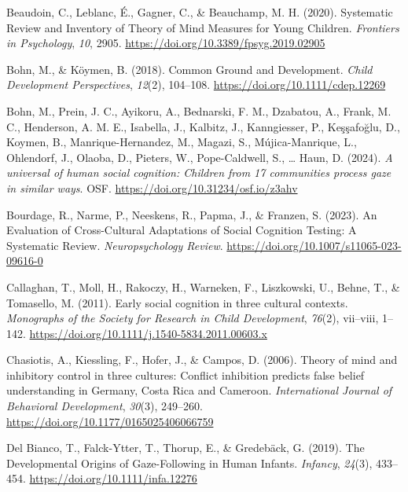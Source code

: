 \documentclass[
  man,mask,floatsintext]{apa7}
\newlength{\cslhangindent}
\newlength{\cslentryspacingunit} %
\newenvironment{CSLReferences}[2] %
 {%
  \setlength{\parindent}{0pt}
  \ifodd #1
  \let\oldpar\par
  \def\par{\hangindent=\cslhangindent\oldpar}
  \fi
  \setlength{\parskip}{#2\cslentryspacingunit}
 }%
 {}
\begin{document}
\hypertarget{refs}{}
\begin{CSLReferences}{1}{0}
\leavevmode{}%
Beaudoin, C., Leblanc, É., Gagner, C., \& Beauchamp, M. H. (2020). Systematic {Review} and {Inventory} of {Theory} of {Mind Measures} for {Young Children}. \emph{Frontiers in Psychology}, \emph{10}, 2905. \url{https://doi.org/10.3389/fpsyg.2019.02905}

\leavevmode{}%
Bohn, M., \& Köymen, B. (2018). Common {Ground} and {Development}. \emph{Child Development Perspectives}, \emph{12}(2), 104--108. \url{https://doi.org/10.1111/cdep.12269}

\leavevmode{}%
Bohn, M., Prein, J. C., Ayikoru, A., Bednarski, F. M., Dzabatou, A., Frank, M. C., Henderson, A. M. E., Isabella, J., Kalbitz, J., Kanngiesser, P., Keşşafoğlu, D., Koymen, B., Manrique-Hernandez, M., Magazi, S., Mújica-Manrique, L., Ohlendorf, J., Olaoba, D., Pieters, W., Pope-Caldwell, S., \ldots{} Haun, D. (2024). \emph{A universal of human social cognition: {Children} from 17 communities process gaze in similar ways}. OSF. \url{https://doi.org/10.31234/osf.io/z3ahv}

\leavevmode{}%
Bourdage, R., Narme, P., Neeskens, R., Papma, J., \& Franzen, S. (2023). An {Evaluation} of {Cross-Cultural Adaptations} of {Social Cognition Testing}: {A Systematic Review}. \emph{Neuropsychology Review}. \url{https://doi.org/10.1007/s11065-023-09616-0}

\leavevmode{}%
Callaghan, T., Moll, H., Rakoczy, H., Warneken, F., Liszkowski, U., Behne, T., \& Tomasello, M. (2011). Early social cognition in three cultural contexts. \emph{Monographs of the Society for Research in Child Development}, \emph{76}(2), vii--viii, 1--142. \url{https://doi.org/10.1111/j.1540-5834.2011.00603.x}

\leavevmode{}%
Chasiotis, A., Kiessling, F., Hofer, J., \& Campos, D. (2006). Theory of mind and inhibitory control in three cultures: {Conflict} inhibition predicts false belief understanding in {Germany}, {Costa Rica} and {Cameroon}. \emph{International Journal of Behavioral Development}, \emph{30}(3), 249--260. \url{https://doi.org/10.1177/0165025406066759}

\leavevmode{}%
Del Bianco, T., Falck-Ytter, T., Thorup, E., \& Gredebäck, G. (2019). The {Developmental Origins} of {Gaze-Following} in {Human Infants}. \emph{Infancy}, \emph{24}(3), 433--454. \url{https://doi.org/10.1111/infa.12276}


\end{CSLReferences}
\end{document}
